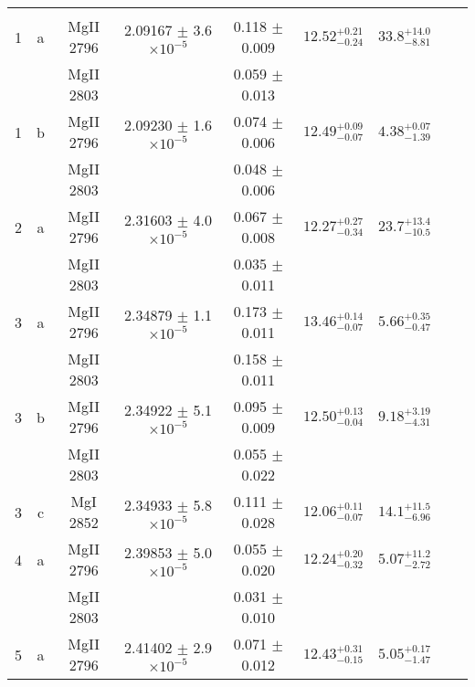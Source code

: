 \documentclass[12pt]{article}
\begin{document}
\begin{footnotesize}
\begin{longtable}{ c c c c c c c c c}
\hline                                                                                                                                                   
		&	   &                           &            & 	& 					&							  	& \\                                                                 
       1  & a  & MgII     2796  &  2.09167 $\pm$ 3.6 $\times 10^{-5}$   &  0.118 $\pm$ 0.009   & $12.52_{ - 0.24}^{ + 0.21}$  & $33.8_{ - 8.81}^{ + 14.0}$    & 	 & \\ 
  &   & MgII     2803  &  &  0.059 $\pm$ 0.013   &   &     & 	 & \\ 
       1  & b  & MgII     2796  &  2.09230 $\pm$ 1.6 $\times 10^{-5}$   &  0.074 $\pm$ 0.006   & $12.49_{ - 0.07}^{ + 0.09}$  & $4.38_{ - 1.39}^{ + 0.07}$    & 	 & \\ 
  &   & MgII     2803  &  &  0.048 $\pm$ 0.006   &   &     & 	 & \\ 
       2  & a  & MgII     2796  &  2.31603 $\pm$ 4.0 $\times 10^{-5}$   &  0.067 $\pm$ 0.008   & $12.27_{ - 0.34}^{ + 0.27}$  & $23.7_{ - 10.5}^{ + 13.4}$    & 	 & \\ 
  &   & MgII     2803  &  &  0.035 $\pm$ 0.011   &   &     & 	 & \\ 
       3  & a  & MgII     2796  &  2.34879 $\pm$ 1.1 $\times 10^{-5}$   &  0.173 $\pm$ 0.011   & $13.46_{ - 0.07}^{ + 0.14}$  & $5.66_{ - 0.47}^{ + 0.35}$    & 	 & \\ 
  &   & MgII     2803  &  &  0.158 $\pm$ 0.011   &   &     & 	 & \\ 
       3  & b  & MgII     2796  &  2.34922 $\pm$ 5.1 $\times 10^{-5}$   &  0.095 $\pm$ 0.009   & $12.50_{ - 0.04}^{ + 0.13}$  & $9.18_{ - 4.31}^{ + 3.19}$    & 	 & \\ 
  &   & MgII     2803  &  &  0.055 $\pm$ 0.022   &   &     & 	 & \\ 
       3  & c  & MgI     2852  &  2.34933 $\pm$ 5.8 $\times 10^{-5}$   &  0.111 $\pm$ 0.028   & $12.06_{ - 0.07}^{ + 0.11}$  & $14.1_{ - 6.96}^{ + 11.5}$    & 	 & \\ 
       4  & a  & MgII     2796  &  2.39853 $\pm$ 5.0 $\times 10^{-5}$   &  0.055 $\pm$ 0.020   & $12.24_{ - 0.32}^{ + 0.20}$  & $5.07_{ - 2.72}^{ + 11.2}$    & 	 & \\ 
  &   & MgII     2803  &  &  0.031 $\pm$ 0.010   &   &     & 	 & \\ 
       5  & a  & MgII     2796  &  2.41402 $\pm$ 2.9 $\times 10^{-5}$   &  0.071 $\pm$ 0.012   & $12.43_{ - 0.15}^{ + 0.31}$  & $5.05_{ - 1.47}^{ + 0.17}$    & 	 & \\ 

\end{longtable}
\end{footnotesize}
\end{document}
